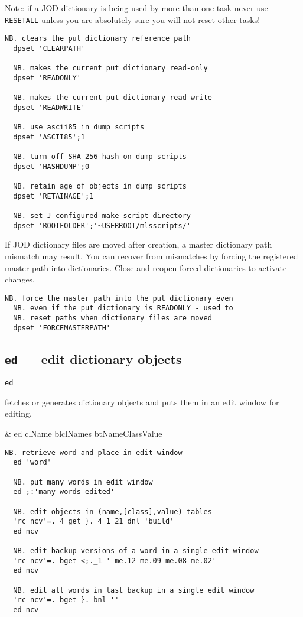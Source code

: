 Note: if a JOD dictionary is being used 
by more than one task never use \texttt{RESETALL} unless 
you are absolutely sure you will not reset other tasks!

\begin{lstlisting}[frame=single,framerule=0pt]
  NB. clears the put dictionary reference path
  dpset 'CLEARPATH'  
  
  NB. makes the current put dictionary read-only 
  dpset 'READONLY'    
  
  NB. makes the current put dictionary read-write
  dpset 'READWRITE'   
  
  NB. use ascii85 in dump scripts 
  dpset 'ASCII85';1  

  NB. turn off SHA-256 hash on dump scripts
  dpset 'HASHDUMP';0
  
  NB. retain age of objects in dump scripts
  dpset 'RETAINAGE';1
  
  NB. set J configured make script directory
  dpset 'ROOTFOLDER';'~USERROOT/mlsscripts/' 
\end{lstlisting}

If JOD dictionary files are moved after creation, a master
dictionary path mismatch may result. You can recover from
mismatches by forcing the registered master path into 
dictionaries. Close and reopen forced dictionaries to activate changes.
 
\begin{lstlisting}[frame=single,framerule=0pt]
  NB. force the master path into the put dictionary even
  NB. even if the put dictionary is READONLY - used to
  NB. reset paths when dictionary files are moved
  dpset 'FORCEMASTERPATH'
\end{lstlisting}


\subsection{\texttt{ed} --- edit dictionary objects}\label{ss:ed}

\hypertarget{il:ed}{\texttt{ed}} fetches or generates dictionary objects and puts 
them in an edit window for editing.

\begin{wordhead}
\monad & ed clName \argsep blclNames \argsep btNameClassValue \\
\end{wordhead}
\begin{lstlisting}[frame=single,framerule=0pt]
  NB. retrieve word and place in edit window
  ed 'word'
  
  NB. put many words in edit window 
  ed ;:'many words edited' 
  
  NB. edit objects in (name,[class],value) tables
  'rc ncv'=. 4 get }. 4 1 21 dnl 'build'
  ed ncv
  
  NB. edit backup versions of a word in a single edit window
  'rc ncv'=. bget <;._1 ' me.12 me.09 me.08 me.02'
  ed ncv
  
  NB. edit all words in last backup in a single edit window
  'rc ncv'=. bget }. bnl ''
  ed ncv
\end{lstlisting} 


